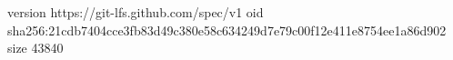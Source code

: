 version https://git-lfs.github.com/spec/v1
oid sha256:21cdb7404cce3fb83d49c380e58c634249d7e79c00f12e411e8754ee1a86d902
size 43840
